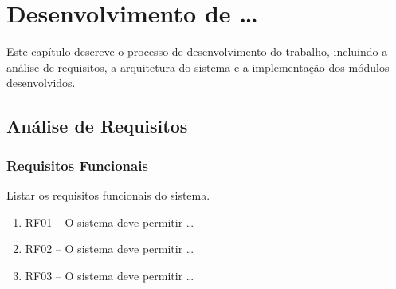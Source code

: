 %


\chapter{Desenvolvimento de \ldots}
\label{cap:desenvolvimento}

Este capítulo descreve o processo de desenvolvimento do trabalho, incluindo a análise de requisitos, a arquitetura do sistema e a implementação dos módulos desenvolvidos.

\section{Análise de Requisitos}
\label{sec:requisitos}


\subsection{Requisitos Funcionais}
\label{subsec:req_funcionais}

Listar os requisitos funcionais do sistema.

\begin{enumerate}
    \item RF01 -- O sistema deve permitir \ldots
    \item RF02 -- O sistema deve permitir \ldots
    \item RF03 -- O sistema deve permitir \ldots
\end{enumerate}


